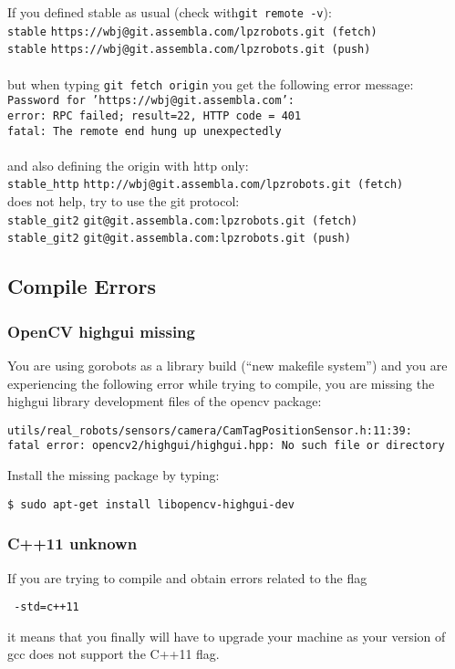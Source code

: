 If you defined stable as usual (check with{\tt git remote -v}):\\
 \nolinkurl{stable}    \nolinkurl{https://wbj@git.assembla.com/lpzrobots.git (fetch)}\\
 \nolinkurl{stable}    \nolinkurl{https://wbj@git.assembla.com/lpzrobots.git (push)}\\\\
%
but when typing {\tt git fetch origin} you get the following error message: \\
{\tt Password for 'https://wbj@git.assembla.com':} \\
{\tt error: RPC failed; result=22, HTTP code = 401} \\
{\tt fatal: The remote end hung up unexpectedly} \\\\
%
and also defining the origin with http only:\\
\nolinkurl{stable_http}    \nolinkurl{http://wbj@git.assembla.com/lpzrobots.git (fetch)}\\
does not help, try to use the git protocol:\\
\nolinkurl{stable_git2}    \nolinkurl{git@git.assembla.com:lpzrobots.git (fetch)}\\
\nolinkurl{stable_git2}      \nolinkurl{git@git.assembla.com:lpzrobots.git (push)}

\subsection{Compile Errors}

\subsubsection{OpenCV highgui missing}
You are using gorobots as a library build (``new makefile system'') and you
are experiencing the following error while trying to compile, you are missing
the highgui library development files of the opencv package:
\begin{lstlisting}
utils/real_robots/sensors/camera/CamTagPositionSensor.h:11:39: 
fatal error: opencv2/highgui/highgui.hpp: No such file or directory
\end{lstlisting}
Install the missing package by typing:
\begin{lstlisting}
$ sudo apt-get install libopencv-highgui-dev
\end{lstlisting}

\subsubsection{C++11 unknown}
If you are trying to compile and obtain errors related to the flag 
\begin{lstlisting}
 -std=c++11
\end{lstlisting}
it means that you finally will have to upgrade your machine as your version of
gcc does not support the C++11 flag.

